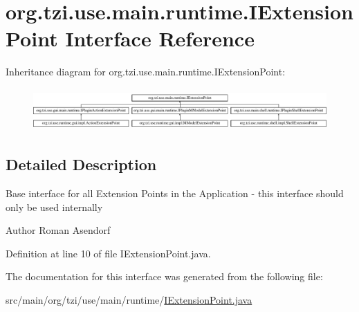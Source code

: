 \hypertarget{interfaceorg_1_1tzi_1_1use_1_1main_1_1runtime_1_1_i_extension_point}{\section{org.\-tzi.\-use.\-main.\-runtime.\-I\-Extension\-Point Interface Reference}
\label{interfaceorg_1_1tzi_1_1use_1_1main_1_1runtime_1_1_i_extension_point}
}
Inheritance diagram for org.\-tzi.\-use.\-main.\-runtime.\-I\-Extension\-Point\-:\begin{figure}[H]
\begin{center}
\leavevmode
\includegraphics[height=1.623188cm]{interfaceorg_1_1tzi_1_1use_1_1main_1_1runtime_1_1_i_extension_point}
\end{center}
\end{figure}


\subsection{Detailed Description}
Base interface for all Extension Points in the Application -\/ this interface should only be used internally

\begin{DoxyAuthor}{Author}
Roman Asendorf 
\end{DoxyAuthor}


Definition at line 10 of file I\-Extension\-Point.\-java.



The documentation for this interface was generated from the following file\-:\begin{DoxyCompactItemize}
\item 
src/main/org/tzi/use/main/runtime/\hyperlink{_i_extension_point_8java}{I\-Extension\-Point.\-java}\end{DoxyCompactItemize}
